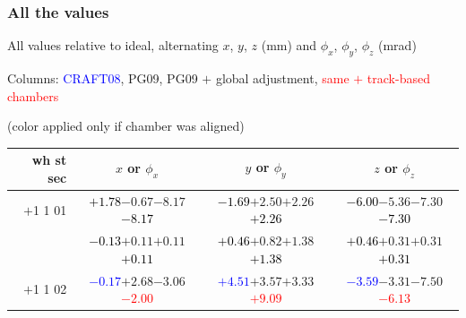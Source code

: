 \documentclass[compress]{beamer}
\begin{document}
\begin{frame}
\frametitle{All the values}
\tiny

All values relative to ideal, alternating $x$, $y$, $z$ (mm) and $\phi_x$, $\phi_y$, $\phi_z$ (mrad)

Columns: \textcolor{blue}{CRAFT08}, PG09, PG09 $+$ global adjustment, \textcolor{red}{same $+$ track-based chambers}

\hfill (color applied only if chamber was aligned)

\vfill
\renewcommand{\arraystretch}{1.1}
\begin{tabular}{r | c | c | c}
wh st sec & $x$ or $\phi_x$ & $y$ or $\phi_y$ & $z$ or $\phi_z$ \\\hline
$+$1 1 01 & \textcolor{black}{$+1.78$}\hspace{0.1 cm}$-0.67$\hspace{0.1 cm}$-8.17$\hspace{0.1 cm}\textcolor{black}{$-8.17$} & \textcolor{black}{$-1.69$}\hspace{0.1 cm}$+2.50$\hspace{0.1 cm}$+2.26$\hspace{0.1 cm}\textcolor{black}{$+2.26$} & \textcolor{black}{$-6.00$}\hspace{0.1 cm}$-5.36$\hspace{0.1 cm}$-7.30$\hspace{0.1 cm}\textcolor{black}{$-7.30$} \\
          & \textcolor{black}{$-0.13$}\hspace{0.1 cm}$+0.11$\hspace{0.1 cm}$+0.11$\hspace{0.1 cm}\textcolor{black}{$+0.11$} & \textcolor{black}{$+0.46$}\hspace{0.1 cm}$+0.82$\hspace{0.1 cm}$+1.38$\hspace{0.1 cm}\textcolor{black}{$+1.38$} & \textcolor{black}{$+0.46$}\hspace{0.1 cm}$+0.31$\hspace{0.1 cm}$+0.31$\hspace{0.1 cm}\textcolor{black}{$+0.31$} \\
$+$1 1 02 & \textcolor{blue}{$-0.17$}\hspace{0.1 cm}$+2.68$\hspace{0.1 cm}$-3.06$\hspace{0.1 cm}\textcolor{red}{$-2.00$} & \textcolor{blue}{$+4.51$}\hspace{0.1 cm}$+3.57$\hspace{0.1 cm}$+3.33$\hspace{0.1 cm}\textcolor{red}{$+9.09$} & \textcolor{blue}{$-3.59$}\hspace{0.1 cm}$-3.31$\hspace{0.1 cm}$-7.50$\hspace{0.1 cm}\textcolor{red}{$-6.13$} \\

\end{tabular}
\end{frame}
\end{document}

